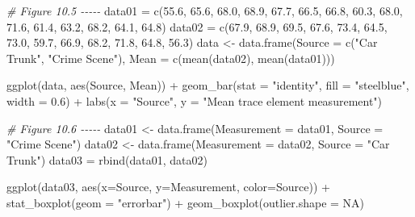 \documentclass[
]{book}
\newenvironment{Shaded}{\begin{snugshade}}{\end{snugshade}}
\newcommand{\AttributeTok}[1]{\textcolor[rgb]{0.77,0.63,0.00}{#1}}
\newcommand{\CommentTok}[1]{\textcolor[rgb]{0.56,0.35,0.01}{\textit{#1}}}
\newcommand{\ConstantTok}[1]{\textcolor[rgb]{0.00,0.00,0.00}{#1}}
\newcommand{\FloatTok}[1]{\textcolor[rgb]{0.00,0.00,0.81}{#1}}
\newcommand{\FunctionTok}[1]{\textcolor[rgb]{0.00,0.00,0.00}{#1}}
\newcommand{\NormalTok}[1]{#1}
\newcommand{\OtherTok}[1]{\textcolor[rgb]{0.56,0.35,0.01}{#1}}
\newcommand{\SpecialCharTok}[1]{\textcolor[rgb]{0.00,0.00,0.00}{#1}}
\newcommand{\StringTok}[1]{\textcolor[rgb]{0.31,0.60,0.02}{#1}}
\begin{document}
\begin{Shaded}
\begin{Highlighting}[]
\CommentTok{\# Figure 10.5 {-}{-}{-}{-}{-}}
\NormalTok{data01 }\OtherTok{=} \FunctionTok{c}\NormalTok{(}\FloatTok{55.6}\NormalTok{, }\FloatTok{65.6}\NormalTok{, }\FloatTok{68.0}\NormalTok{, }\FloatTok{68.9}\NormalTok{, }\FloatTok{67.7}\NormalTok{, }\FloatTok{66.5}\NormalTok{, }\FloatTok{66.8}\NormalTok{, }\FloatTok{60.3}\NormalTok{, }\FloatTok{68.0}\NormalTok{, }\FloatTok{71.6}\NormalTok{, }\FloatTok{61.4}\NormalTok{, }\FloatTok{63.2}\NormalTok{, }\FloatTok{68.2}\NormalTok{, }\FloatTok{64.1}\NormalTok{, }\FloatTok{64.8}\NormalTok{)}
\NormalTok{data02 }\OtherTok{=} \FunctionTok{c}\NormalTok{(}\FloatTok{67.9}\NormalTok{, }\FloatTok{68.9}\NormalTok{, }\FloatTok{69.5}\NormalTok{, }\FloatTok{67.6}\NormalTok{, }\FloatTok{73.4}\NormalTok{, }\FloatTok{64.5}\NormalTok{, }\FloatTok{73.0}\NormalTok{, }\FloatTok{59.7}\NormalTok{, }\FloatTok{66.9}\NormalTok{, }\FloatTok{68.2}\NormalTok{, }\FloatTok{71.8}\NormalTok{, }\FloatTok{64.8}\NormalTok{, }\FloatTok{56.3}\NormalTok{)}
\NormalTok{data }\OtherTok{\textless{}{-}} \FunctionTok{data.frame}\NormalTok{(}\AttributeTok{Source =} \FunctionTok{c}\NormalTok{(}\StringTok{"Car Trunk"}\NormalTok{, }\StringTok{"Crime Scene"}\NormalTok{), }
                   \AttributeTok{Mean =} \FunctionTok{c}\NormalTok{(}\FunctionTok{mean}\NormalTok{(data02), }\FunctionTok{mean}\NormalTok{(data01)))}

\FunctionTok{ggplot}\NormalTok{(data, }\FunctionTok{aes}\NormalTok{(Source, Mean)) }\SpecialCharTok{+} 
  \FunctionTok{geom\_bar}\NormalTok{(}\AttributeTok{stat =} \StringTok{"identity"}\NormalTok{, }\AttributeTok{fill =} \StringTok{"steelblue"}\NormalTok{, }\AttributeTok{width =} \FloatTok{0.6}\NormalTok{) }\SpecialCharTok{+} 
  \FunctionTok{labs}\NormalTok{(}\AttributeTok{x =} \StringTok{"Source"}\NormalTok{, }\AttributeTok{y =} \StringTok{"Mean trace element measurement"}\NormalTok{)}

\CommentTok{\# Figure 10.6 {-}{-}{-}{-}{-}}
\NormalTok{data01 }\OtherTok{\textless{}{-}} \FunctionTok{data.frame}\NormalTok{(}\AttributeTok{Measurement =}\NormalTok{ data01, }\AttributeTok{Source =} \StringTok{"Crime Scene"}\NormalTok{)}
\NormalTok{data02 }\OtherTok{\textless{}{-}} \FunctionTok{data.frame}\NormalTok{(}\AttributeTok{Measurement =}\NormalTok{ data02, }\AttributeTok{Source =} \StringTok{"Car Trunk"}\NormalTok{)}
\NormalTok{data03 }\OtherTok{=} \FunctionTok{rbind}\NormalTok{(data01, data02)}

\FunctionTok{ggplot}\NormalTok{(data03, }\FunctionTok{aes}\NormalTok{(}\AttributeTok{x=}\NormalTok{Source, }\AttributeTok{y=}\NormalTok{Measurement, }\AttributeTok{color=}\NormalTok{Source)) }\SpecialCharTok{+} 
  \FunctionTok{stat\_boxplot}\NormalTok{(}\AttributeTok{geom =} \StringTok{"errorbar"}\NormalTok{) }\SpecialCharTok{+} \FunctionTok{geom\_boxplot}\NormalTok{(}\AttributeTok{outlier.shape =} \ConstantTok{NA}\NormalTok{)}
\end{Highlighting}
\end{Shaded}
\end{document}

